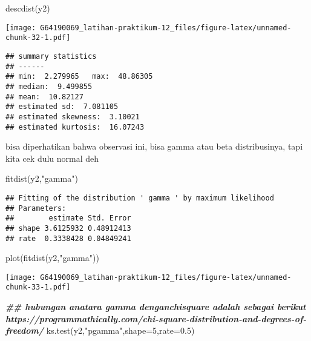 \documentclass[
]{article}
\newenvironment{Shaded}{\begin{snugshade}}{\end{snugshade}}
\newcommand{\AttributeTok}[1]{\textcolor[rgb]{0.77,0.63,0.00}{#1}}
\newcommand{\DecValTok}[1]{\textcolor[rgb]{0.00,0.00,0.81}{#1}}
\newcommand{\DocumentationTok}[1]{\textcolor[rgb]{0.56,0.35,0.01}{\textbf{\textit{#1}}}}
\newcommand{\FloatTok}[1]{\textcolor[rgb]{0.00,0.00,0.81}{#1}}
\newcommand{\FunctionTok}[1]{\textcolor[rgb]{0.00,0.00,0.00}{#1}}
\newcommand{\NormalTok}[1]{#1}
\newcommand{\StringTok}[1]{\textcolor[rgb]{0.31,0.60,0.02}{#1}}
\begin{document}
\begin{Shaded}
\begin{Highlighting}[]
\FunctionTok{descdist}\NormalTok{(y2)}
\end{Highlighting}
\end{Shaded}

\texttt{[image: G64190069\_latihan-praktikum-12\_files/figure-latex/unnamed-chunk-32-1.pdf]}

\begin{verbatim}
## summary statistics
## ------
## min:  2.279965   max:  48.86305 
## median:  9.499855 
## mean:  10.82127 
## estimated sd:  7.081105 
## estimated skewness:  3.10021 
## estimated kurtosis:  16.07243
\end{verbatim}

bisa diperhatikan bahwa observasi ini, bisa gamma atau beta
distribusinya, tapi kita cek dulu normal deh

\begin{Shaded}
\begin{Highlighting}[]
\FunctionTok{fitdist}\NormalTok{(y2,}\StringTok{"gamma"}\NormalTok{)}
\end{Highlighting}
\end{Shaded}

\begin{verbatim}
## Fitting of the distribution ' gamma ' by maximum likelihood 
## Parameters:
##        estimate Std. Error
## shape 3.6125932 0.48912413
## rate  0.3338428 0.04849241
\end{verbatim}

\begin{Shaded}
\begin{Highlighting}[]
\FunctionTok{plot}\NormalTok{(}\FunctionTok{fitdist}\NormalTok{(y2,}\StringTok{"gamma"}\NormalTok{))}
\end{Highlighting}
\end{Shaded}

\texttt{[image: G64190069\_latihan-praktikum-12\_files/figure-latex/unnamed-chunk-33-1.pdf]}

\begin{Shaded}
\begin{Highlighting}[]
\DocumentationTok{\#\# hubungan anatara gamma denganchisquare adalah sebagai berikut https://programmathically.com/chi{-}square{-}distribution{-}and{-}degrees{-}of{-}freedom/}
\FunctionTok{ks.test}\NormalTok{(y2,}\StringTok{"pgamma"}\NormalTok{,}\AttributeTok{shape=}\DecValTok{5}\NormalTok{,}\AttributeTok{rate=}\FloatTok{0.5}\NormalTok{)}
\end{Highlighting}
\end{Shaded}
\end{document}
